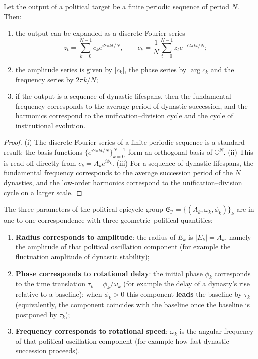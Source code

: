 \begin{theorem}\label{thm:politics_series_reconstruction}
Let the output of a political target be a finite periodic sequence of period $N$. Then:
\begin{enumerate}[label=(\roman*)]
    \item the output can be expanded as a discrete Fourier series
    \[
    z_t=\sum_{k=0}^{N-1}c_k e^{i2\pi kt/N},\qquad
    c_k=\frac1N\sum_{t=0}^{N-1}z_t e^{-i2\pi kt/N};
    \]
    \item the amplitude series is given by $|c_k|$, the phase series by $\arg c_k$ and the frequency series by $2\pi k/N$;
    \item if the output is a sequence of dynastic lifespans, then the fundamental frequency corresponds to the average period of dynastic succession, and the harmonics correspond to the unification--division cycle and the cycle of institutional evolution.
\end{enumerate}
\end{theorem}

\begin{proof}
(i) The discrete Fourier series of a finite periodic sequence is a standard result: the basis functions $\{e^{i2\pi kt/N}\}_{k=0}^{N-1}$ form an orthogonal basis of $\mathbb C^N$.
(ii) This is read off directly from $c_k=A_k e^{i\phi_k}$.
(iii) For a sequence of dynastic lifespans, the fundamental frequency corresponds to the average succession period of the $N$ dynasties, and the low-order harmonics correspond to the unification--division cycle on a larger scale.
\end{proof}

\begin{proposition}\label{prop:politics_epicycle_correspondence}
The three parameters of the political epicycle group $\mathfrak E_{\mathrm{P}}=\{(A_k,\omega_k,\phi_k)\}_{k}$ are in one-to-one correspondence with three geometric--political quantities:
\begin{enumerate}[label=(\roman*)]
    \item \textbf{Radius corresponds to amplitude}: the radius of $E_k$ is $|E_k|=A_k$, namely the amplitude of that political oscillation component (for example the fluctuation amplitude of dynastic stability);
    \item \textbf{Phase corresponds to rotational delay}: the initial phase $\phi_k$ corresponds to the time translation $\tau_k=\phi_k/\omega_k$ (for example the delay of a dynasty's rise relative to a baseline); when $\phi_k>0$ this component \textbf{leads} the baseline by $\tau_k$ (equivalently, the component coincides with the baseline once the baseline is postponed by $\tau_k$);
    \item \textbf{Frequency corresponds to rotational speed}: $\omega_k$ is the angular frequency of that political oscillation component (for example how fast dynastic succession proceeds).
\end{enumerate}
\end{proposition}


